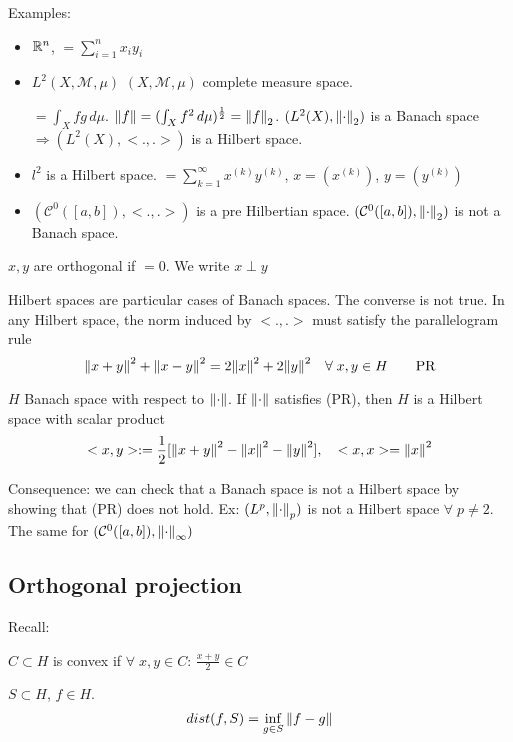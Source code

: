 Examples:
\begin{itemize}
    \item \(\mathbb{R}^n\), \(<x, y> = \sum_{i=1}^n x_i y_i\)
    \item \(L^2(X, \mathcal{M}, \mu)\) \((X, \mathcal{M}, \mu)\) complete measure space. 
    
    \(<f, g> = \int_X fg \, d\mu\). \(\norm{f} = (\int_X f^2 \, d\mu)^\frac{1}{2} = \norm{f}_2\). \((L^2(X), \norm{\cdot}_2)\) is a Banach space \(\Rightarrow (L^2(X), <.,.>)\) is a Hilbert space.
    \item \(l^2\) is a Hilbert space. \(<x, y> = \sum_{k=1}^\infty x^{(k)} y^{(k)}\), \(x = (x^{(k)})\), \(y = (y^{(k)})\)
    \item \((\mathcal{C}^0([a, b]), <.,.> )\) is a pre Hilbertian space. \((\mathcal{C}^0([a, b]), \norm{\cdot}_2 )\) is not a Banach space. 
\end{itemize}

\begin{definition}
    \(x, y\) are orthogonal if \(<x, y>=0\). We write \(x \perp y\)
\end{definition}
\begin{remark}
    Hilbert spaces are particular cases of Banach spaces. The converse is not true. In any Hilbert space, the norm induced by \(<.,.>\) must satisfy the parallelogram rule
    \[
        \norm{x+y}^2 + \norm{x-y}^2 = 2\norm{x}^2 + 2\norm{y}^2 \quad \forall \; x, y \in H \tag*{PR}
    \]
\end{remark}

\begin{proposition}
    \(H\) Banach space with respect to \(\norm{\cdot}\). If \(\norm{\cdot}\) satisfies (PR), then \(H\) is a Hilbert space with scalar product 
    \[
        <x, y> := \frac{1}{2} [\norm{x+y}^2 - \norm{x}^2 - \norm{y}^2], \quad <x,x> = \norm{x}^2
    \]
\end{proposition}

Consequence: we can check that a Banach space is not a Hilbert space by showing that (PR) does not hold.
Ex: \((L^p, \norm{\cdot}_p)\) is not a Hilbert space \(\forall\; p \neq 2\). The same for \((\mathcal{C}^0([a, b]), \norm{\cdot}_\infty )\)

\subsection*{Orthogonal projection}

Recall:
\begin{definition}
    \(C \subset H \) is convex if \(\forall\; x, y \in C: \, \frac{x+y}{2} \in C\)
\end{definition}
\begin{definition}
    \(S \subset H\), \(f \in H\). \[ dist (f, S) = \inf_{g \in S} \norm{f-g}\]
\end{definition}

